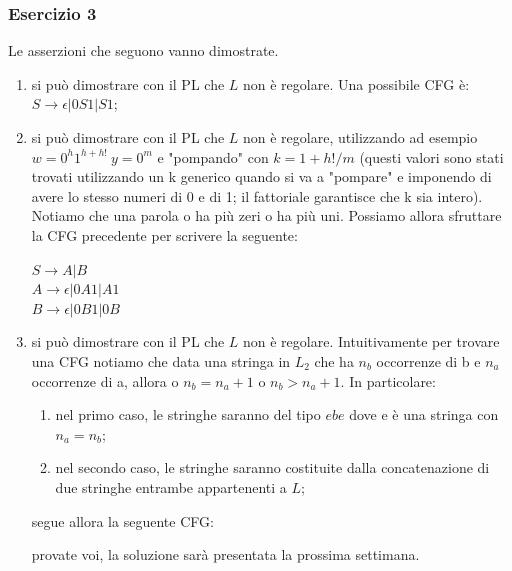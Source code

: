 \documentclass[a4paper,11pt]{article}
\begin{document}
\subsubsection{Esercizio 3}
Le asserzioni che seguono vanno dimostrate.
    \begin{enumerate}
        \item si può dimostrare con il PL che $L$ non è regolare. Una possibile CFG è: $S \rightarrow \epsilon | 0S1 | S1$;
        \item si può dimostrare con il PL che $L$ non è regolare, utilizzando ad esempio $w=0^h1^{h+h!} \: y=0^m$ e "pompando" con $k=1+h!/m$ (questi valori sono stati trovati utilizzando un k generico quando si va a "pompare" e imponendo di avere lo stesso numeri di 0 e di 1; il fattoriale garantisce che k sia intero). Notiamo che una parola o ha più zeri o ha più uni. Possiamo allora sfruttare la CFG precedente per scrivere la seguente:\\
        \begin{minipage}{\linewidth}
            \centering $S \rightarrow A | B$\\
            \centering $A \rightarrow \epsilon | 0A1 | A1$\\
            \centering $B \rightarrow \epsilon | 0B1 | 0B$\\
        \end{minipage}
        \item si può dimostrare con il PL che $L$ non è regolare. Intuitivamente per trovare una CFG notiamo che data una stringa in $L_2$ che ha $n_b$ occorrenze di b e $n_a$ occorrenze di a, allora o $n_b=n_a+1$ o $n_b>n_a+1$. In particolare:
        \begin{enumerate}
            \item nel primo caso, le stringhe saranno del tipo $ebe$ dove e è una stringa con $n_a=n_b$;
            \item nel secondo caso, le stringhe saranno costituite dalla concatenazione di due stringhe entrambe appartenenti a $L$;
        \end{enumerate}
        segue allora la seguente CFG:\\
        \begin{minipage}{\linewidth}
            \centering provate voi, la soluzione sarà presentata la prossima settimana.%
        \end{minipage}
  \end{enumerate}
    
\end{document}
